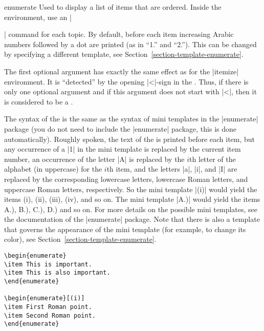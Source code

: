 \begin{environment}{{enumerate}} 
  Used to display a list of items that are ordered.  Inside the
  environment, use an |\item| command for each topic. By default,
  before each item increasing Arabic numbers  followed by a dot are
  printed (as in ``1.'' and ``2.''). This can be changed by specifying
  a different template,  see
  Section~\ref{section-template-enumerate}.

  The first optional argument  has
  exactly the same effect as for the |itemize| environment. It is
  ``detected'' by the opening |<|-sign in the . Thus, if there is only one optional argument and
  if this argument does not start with |<|, then it is considered to
  be a . 

  The syntax of the  is the same as
  the syntax of mini templates in the |enumerate| package (you do not
  need to include the 
  |enumerate| package, this is done automatically). Roughly spoken,
  the text of the  is printed before each item,
  but any occurrence of a |1| in the mini template is replaced by the
  current item number, an occurrence of the letter |A| is replaced by
  the $i$th letter of the alphabet (in uppercase) for the $i$th item,
  and the letters |a|, |i|, and |I| are replaced by the corresponding
  lowercase letters, lowercase Roman letters, and uppercase Roman
  letters, respectively. So the mini template |(i)| would yield the
  items (i), (ii), (iii), (iv), and so on. The mini template |A.)|
  would yield the items A.), B.), C.), D.) and so on. For more details
  on the possible mini templates, see the documentation of the
  |enumerate| package. Note that there is also a template that governs
  the appearance of the mini template (for example, to change its
  color), see Section~\ref{section-template-enumerate}.
  
  \example
\begin{verbatim}
\begin{enumerate}
\item This is important.
\item This is also important.
\end{enumerate}

\begin{enumerate}[(i)]
\item First Roman point.
\item Second Roman point.
\end{enumerate}


\end{verbatim}
\end{environment}
